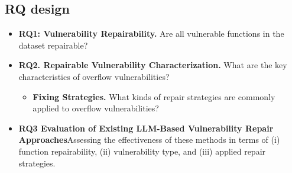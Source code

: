 \subsection{RQ design}


\begin{itemize}
  \item \textbf{RQ1: Vulnerability Repairability.} Are all vulnerable functions in the dataset repairable?

  \item \textbf{RQ2. Repairable Vulnerability Characterization.} What are the key characteristics of overflow vulnerabilities?
  \begin{itemize}

    \item \textbf{Fixing Strategies.} What kinds of repair strategies are commonly applied to overflow vulnerabilities?
  \end{itemize}

  \item \textbf{RQ3 Evaluation of Existing LLM-Based Vulnerability Repair Approaches}Assessing the effectiveness of these methods in terms of (i) function repairability, (ii) vulnerability type, and (iii) applied repair strategies.
  


\end{itemize}







